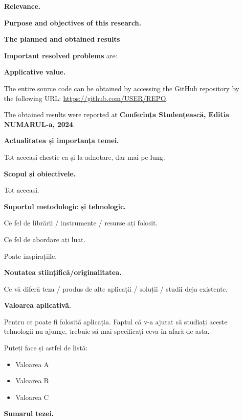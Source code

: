 \documentclass[a4paper,12pt]{report}
\renewcommand{\year}{2024}
\newcommand{\conferencesList}{Conferința Studențească, Editia NUMARUL-a, \year}
\newcommand{\github}{\url{https://github.com/USER/REPO}}
\begin{document}
\textbf{Relevance.}

\textbf{Purpose and objectives of this research.}

\textbf{The planned and obtained results}

\textbf{Important resolved problems} are:

\textbf{Applicative value.} 

The entire source code can be obtained by accessing the GitHub repository
by the following URL: \github. 

The obtained results were reported at \textbf{\conferencesList}\cite{self}.

\clearpage
{}
\begin{acronym}[JPEG]
\end{acronym}

\introChapter

\textbf{Actualitatea și importanța temei.}

Tot aceeași chestie ca și la adnotare, dar mai pe lung.

\textbf{Scopul și obiectivele.}

Tot aceeași.

\textbf{Suportul metodologic și tehnologic.}

Ce fel de librării / instrumente / resurse ați folosit.

Ce fel de abordare ați luat.

Poate inspirațiile.


\textbf{Noutatea stiințifică/originalitatea.}

Ce vă diferă teza / produs de alte aplicații / soluții / studii deja existente.

\textbf{Valoarea aplicativă.}

Pentru ce poate fi folosită aplicația.
Faptul că v-a ajutat să studiați aceste tehnologii nu ajunge, 
trebuie să mai specificați ceva în afară de asta.

Puteți face și astfel de listă:
\begin{itemize}
    \item Valoarea A
    \item Valoarea B
    \item Valoarea C
\end{itemize}

\textbf{Sumarul tezei.}
\end{document}
